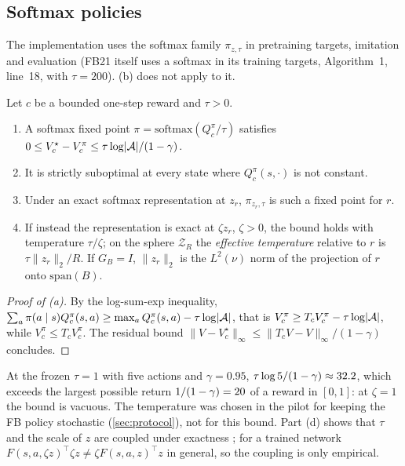 \subsection{Softmax policies}

The implementation uses the softmax family $\pi_{z,\tau}$ in pretraining targets, imitation and evaluation (FB21 itself uses a softmax in its training targets, Algorithm~1, line~18, with $\tau=200$).
(b) does not apply to it.

\begin{proposition}\label{prop:m-fb-softmax}
Let $c$ be a bounded one-step reward and $\tau>0$.
\begin{enumerate}[nosep,label=(\alph*)]
\item A softmax fixed point $\pi=\mathrm{softmax}(Q^\pi_c/\tau)$ satisfies $0\le V^\star_c-V^\pi_c\le\tau\log\lvert\cA\rvert/(1-\gamma)$.
\item It is strictly suboptimal at every state where $Q^\pi_c(s,\cdot)$ is not constant.
\item Under an exact softmax representation at $z_r$, $\pi_{z_r,\tau}$ is such a fixed point for $r$.
\item If instead the representation is exact at $\zeta z_r$, $\zeta>0$, the bound holds with temperature $\tau/\zeta$; on the sphere $\mathcal Z_R$ the \emph{effective temperature} relative to $r$ is $\tau\lVert z_r\rVert_2/R$. If $G_B=I$, $\lVert z_r\rVert_2$ is the $L^2(\nu)$ norm of the projection of $r$ onto $\mathrm{span}(B)$.
\end{enumerate}
\end{proposition}
\begin{proof}[Proof of (a)]
By the log-sum-exp inequality, $\sum_a\pi(a\mid s)Q^\pi_c(s,a)\ge\max_aQ^\pi_c(s,a)-\tau\log\lvert\cA\rvert$, that is $V^\pi_c\ge T_cV^\pi_c-\tau\log\lvert\cA\rvert$, while $V^\pi_c\le T_cV^\pi_c$. The residual bound $\lVert V-V^\star_c\rVert_\infty\le\lVert T_cV-V\rVert_\infty/(1-\gamma)$ concludes.
\end{proof}

At the frozen $\tau=1$ with five actions and $\gamma=0.95$, $\tau\log5/(1-\gamma)\approx\vn{const.taulog5}{32.2}$, which exceeds the largest possible return $1/(1-\gamma)=\vn{const.mass}{20}$ of a reward in $[0,1]$: at $\zeta=1$ the bound is vacuous.
The temperature was chosen in the pilot for keeping the FB policy stochastic (\cref{sec:protocol}), not for this bound.
Part (d) shows that $\tau$ and the scale of $z$ are coupled under exactness ; for a trained network $F(s,a,\zeta z)^\top\zeta z\ne\zeta F(s,a,z)^\top z$ in general, so the coupling is only empirical.

